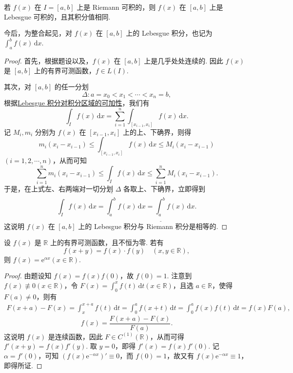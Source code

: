 \documentclass[../../main.tex]{subfiles}
\begin{document}
\begin{theorem}\label{theorem:定理4.25}
若 \( f(x) \) 在 \( I = [a,b] \) 上是 Riemann 可积的，则 \( f(x) \) 在 \( [a,b] \) 上是 Lebesgue 可积的，且其积分值相同.
\end{theorem}
\begin{remark}
今后，为整合起见，对 \( f(x) \) 在 \( [a,b] \) 上的 Lebesgue 积分，也记为$\int_a^b f(x) \, \mathrm{d}x.$
\end{remark}
\begin{proof}
首先，根据题设以及，\( f(x) \) 在 \( [a,b] \) 上是几乎处处连续的. 因此 \( f(x) \) 是 \( [a,b] \) 上的有界可测函数，\( f \in L(I) \).

其次，对 \( [a,b] \) 的任一分划
\[
\Delta: a = x_0 < x_1 < \cdots < x_n = b,
\]
根据\hyperref[theorem:积分对定义域的可数可加性]{Lebesgue 积分对积分区域的可加性}，我们有
\[
\int_I f(x) \, \mathrm{d}x = \sum_{i=1}^n \int_{[x_{i-1}, x_i]} f(x) \, \mathrm{d}x.
\]
记 \( M_i, m_i \) 分别为 \( f(x) \) 在 \( [x_{i-1}, x_i] \) 上的上、下确界，则得
\[
m_i (x_i - x_{i-1}) \leq \int_{[x_{i-1}, x_i]} f(x) \, \mathrm{d}x \leq M_i (x_i - x_{i-1})
\]
\( (i = 1,2,\cdots,n) \)，从而可知
\[
\sum_{i=1}^n m_i (x_i - x_{i-1}) \leq \int_I f(x) \, \mathrm{d}x \leq \sum_{i=1}^n M_i (x_i - x_{i-1}).
\]
于是，在上式左、右两端对一切分划 \( \Delta \) 各取上、下确界，立即得到
\[
\int_I f(x) \, \mathrm{d}x = \overline{\int_a^b} f(x) \, \mathrm{d}x = \underline{\int_a^b} f(x) \, \mathrm{d}x.
\]
这说明 \( f(x) \) 在 \( [a,b] \) 上的 Lebesgue 积分与 Riemann 积分是相等的.
\end{proof}

\begin{proposition}
设 \( f(x) \) 是 \( \mathbb{R} \) 上的有界可测函数，且不恒为零. 若有
\[
f(x + y) = f(x) \cdot f(y) \quad (x, y \in \mathbb{R}),
\]
则 \( f(x) = \mathrm{e}^{\alpha x} (x \in \mathbb{R}) \).
\end{proposition}
\begin{proof}
由题设知 \( f(x) = f(x)f(0) \)，故 \( f(0) = 1 \). 注意到 \( f(x) \not\equiv 0 (x \in \mathbb{R}) \)，令 \( F(x) = \int_0^x f(t) \, \mathrm{d}t (x \in \mathbb{R}) \)，且选 \( a \in \mathbb{R} \)，使得 \( F(a) \neq 0 \)，则有
\begin{align*}
F(x + a) - F(x) = \int_x^{x + a} f(t) \, \mathrm{d}t = \int_0^a f(x + t) \, \mathrm{d}t 
= \int_0^a f(x)f(t) \, \mathrm{d}t = f(x)F(a),
\end{align*}
\[
f(x) = \frac{F(x + a) - F(x)}{F(a)}.
\]
这说明 \( f(x) \) 是连续函数，因此 \( F \in C^{(1)}(\mathbb{R}) \)，从而可得 \( f'(x + y) = f(x)f'(y) \). 取 \( y = 0 \)，即得 \( f'(x) = f(x)f'(0) \). 记 \( \alpha = f'(0) \)，可知 \( (f(x)\mathrm{e}^{-\alpha x})' \equiv 0 \)，而 \( f(0) = 1 \)，故又有 \( f(x)\mathrm{e}^{-\alpha x} \equiv 1 \)，即得所证.
\end{proof}
\end{document}
